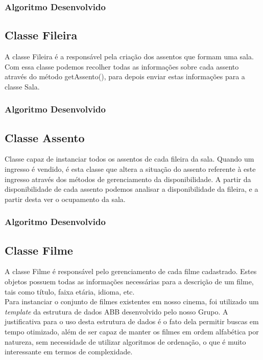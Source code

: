 \documentclass[a4paper]{article}
\begin{document}
\subsubsection{Algoritmo Desenvolvido}


\pagebreak

\subsection{Classe Fileira}
\hspace{5 mm}A classe Fileira é a responsável pela criação dos assentos que formam uma sala.\\
\quad{\null}\hspace{5 mm}Com essa classe podemos recolher todas as informações sobre cada assento através do método getAssento(), para depois enviar estas informações para a classe Sala.

\subsubsection{Algoritmo Desenvolvido}


\pagebreak

\subsection{Classe Assento}
\hspace{5 mm}Classe capaz de instanciar todos os assentos de cada fileira da sala. Quando um ingresso é vendido, é esta classe que altera a situação do assento referente à este ingresso através dos métodos de gerenciamento da disponibilidade. A partir da disponibilidade de cada assento podemos analisar a disponibilidade da fileira, e a partir desta ver o ocupamento da sala.\\

\subsubsection{Algoritmo Desenvolvido}


\pagebreak

\subsection{Classe Filme}
\hspace{5 mm}A classe Filme é responsável pelo gerenciamento de cada filme cadastrado. Estes objetos possuem todas as informações necessárias para a descrição de um filme, tais como título, faixa etária, idioma, etc.\\
\quad{\null}\hspace{5 mm}Para instanciar o conjunto de filmes existentes em nosso cinema, foi utilizado um \textit{template} da estrutura de dados ABB desenvolvido pelo nosso Grupo. A justificativa para o uso desta estrutura de dados é o fato dela permitir buscas em tempo otimizado, além de ser capaz de manter os filmes em ordem alfabética por natureza, sem necessidade de utilizar algoritmos de ordenação, o que é muito interessante em termos de complexidade.
\end{document}

